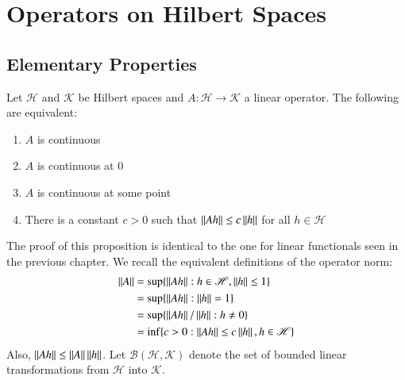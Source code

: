 %
%
%
\chapter{Operators on Hilbert Spaces}
\label{OpHilb} %




\section{Elementary Properties}
\label{sec:Hilb2}

\begin{prop}
    Let $\mathscr{H}$ and $\mathscr{K}$ be Hilbert spaces and $A:\mathscr{H}\rightarrow \mathscr{K}$ a linear operator. The following are equivalent: \begin{enumerate}
        \item $A$ is continuous
        \item $A$ is continuous at $0$
        \item $A$ is continuous at some point
        \item There is a constant $c > 0$ such that $\left|\left| Ah\right|\right| \leq c\left|\left| h\right|\right|$ for all $h \in \mathscr{H}$
    \end{enumerate}
\end{prop}

The proof of this proposition is identical to the one for linear functionals seen in the previous chapter. We recall the equivalent definitions of the operator norm: \begin{align*}
    \left|\left| A\right|\right| &= \sup\{\left|\left| Ah\right|\right|:h \in \mathscr{H},\left|\left| h\right|\right| \leq 1\} \\
    &= \sup\{\left|\left| Ah\right|\right|:\left|\left| h\right|\right| = 1\} \\
    &= \sup\{\left|\left| Ah\right|\right|/\left|\left| h\right|\right|:h\neq 0\} \\
    &= \inf\{c > 0:\left|\left| Ah\right|\right| \leq c\left|\left| h\right|\right|,h \in \mathscr{H}\}
\end{align*}
Also, $\left|\left| Ah\right|\right|\leq \left|\left| A\right|\right|\left|\left| h\right|\right|$. Let $\mathscr{B}(\mathscr{H},\mathscr{K})$ denote the set of bounded linear transformations from $\mathscr{H}$ into $\mathscr{K}$.

